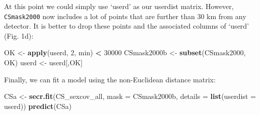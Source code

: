 \documentclass[
]{book}
\newenvironment{Shaded}{\begin{snugshade}}{\end{snugshade}}
\newcommand{\AttributeTok}[1]{\textcolor[rgb]{0.13,0.29,0.53}{#1}}
\newcommand{\ConstantTok}[1]{\textcolor[rgb]{0.56,0.35,0.01}{#1}}
\newcommand{\ControlFlowTok}[1]{\textcolor[rgb]{0.13,0.29,0.53}{\textbf{#1}}}
\newcommand{\DecValTok}[1]{\textcolor[rgb]{0.00,0.00,0.81}{#1}}
\newcommand{\FloatTok}[1]{\textcolor[rgb]{0.00,0.00,0.81}{#1}}
\newcommand{\FunctionTok}[1]{\textcolor[rgb]{0.13,0.29,0.53}{\textbf{#1}}}
\newcommand{\NormalTok}[1]{#1}
\newcommand{\OtherTok}[1]{\textcolor[rgb]{0.56,0.35,0.01}{#1}}
\newcommand{\SpecialCharTok}[1]{\textcolor[rgb]{0.81,0.36,0.00}{\textbf{#1}}}
\newcommand{\StringTok}[1]{\textcolor[rgb]{0.31,0.60,0.02}{#1}}
\begin{document}
\begin{Shaded}
\end{Shaded}

At this point we could simply use `userd' as our userdist matrix. However, \texttt{CSmask2000} now includes a lot of points that are further than 30 km from any detector. It is better to drop these points and the associated columns of `userd' (Fig. 1d):

\begin{Shaded}
\begin{Highlighting}[]
\NormalTok{OK }\OtherTok{\textless{}{-}} \FunctionTok{apply}\NormalTok{(userd, }\DecValTok{2}\NormalTok{, min) }\SpecialCharTok{\textless{}} \DecValTok{30000}
\NormalTok{CSmask2000b }\OtherTok{\textless{}{-}} \FunctionTok{subset}\NormalTok{(CSmask2000, OK)}
\NormalTok{userd }\OtherTok{\textless{}{-}}\NormalTok{ userd[,OK]}
\end{Highlighting}
\end{Shaded}

Finally, we can fit a model using the non-Euclidean distance matrix:

\begin{Shaded}
\begin{Highlighting}[]
\NormalTok{CSa }\OtherTok{\textless{}{-}} \FunctionTok{secr.fit}\NormalTok{(CS\_sexcov\_all, }\AttributeTok{mask =}\NormalTok{ CSmask2000b, }
    \AttributeTok{details =} \FunctionTok{list}\NormalTok{(}\AttributeTok{userdist =}\NormalTok{ userd))}
\FunctionTok{predict}\NormalTok{(CSa)                }
\end{Highlighting}
\end{Shaded}
\end{document}
